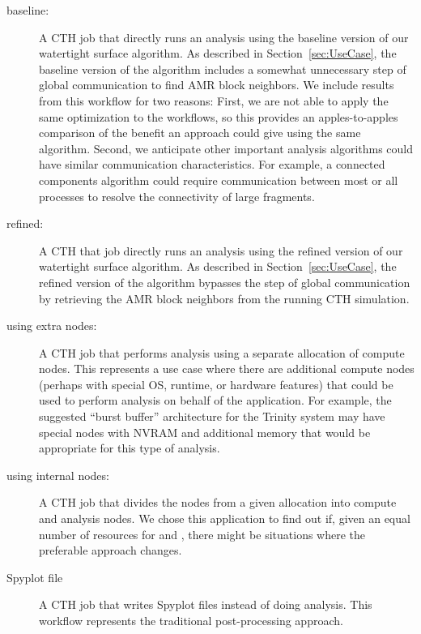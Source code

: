 \begin{description}

\item [\Insitu baseline:] A CTH job that directly runs an \insitu analysis
  using the baseline version of our watertight surface algorithm.  As
  described in Section~\ref{sec:UseCase}, the baseline version of the
  algorithm includes a somewhat unnecessary step of global communication to
  find AMR block neighbors.  We include results from this workflow for two
  reasons: First, we are not able to apply the same optimization to the
  \intransit workflows, so this provides an apples-to-apples comparison
  of the benefit an \intransit approach could give using the same
  algorithm.  Second, we anticipate other important analysis algorithms
  could have similar communication characteristics.  For example, a
  connected components algorithm could require communication between most
  or all processes to resolve the connectivity of large fragments.

\item [\Insitu refined:] A CTH that job directly runs an \insitu analysis
  using the refined version of our watertight surface algorithm.  As
  described in Section~\ref{sec:UseCase}, the refined version of the
  algorithm bypasses the step of global communication by retrieving the AMR
  block neighbors from the running CTH simulation.

\item [\Intransit using extra nodes:] A CTH job that performs \intransit
  analysis using a separate allocation of compute nodes.  This represents a
  use case where there are additional compute nodes (perhaps with special
  OS, runtime, or hardware features) that could be used to perform analysis
  on behalf of the application.  For example, the suggested ``burst
  buffer'' architecture for the Trinity system may have special nodes with
  NVRAM and additional memory that would be appropriate for this type of
  \intransit analysis.

\item [\Intransit using internal nodes:] A CTH job that divides the nodes
  from a given allocation into compute and analysis nodes.  We chose this
  application to find out if, given an equal number of resources for
  \insitu and \intransit, there might be situations where the preferable
  approach changes.

\item [Spyplot file] A CTH job that writes Spyplot files instead of doing
  analysis.  This workflow represents the traditional post-processing
  approach.
\end{description}

